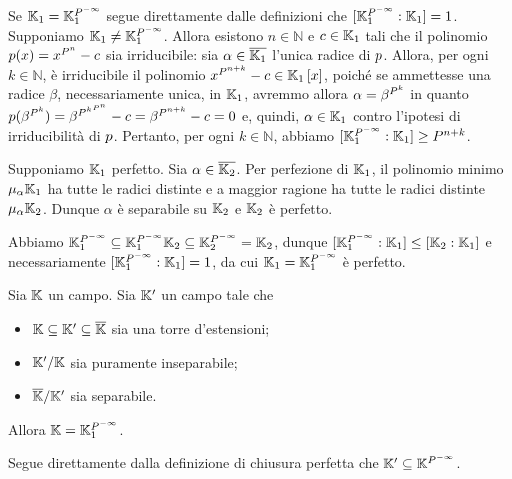 \par Se $\Field_1 = \PerfectClosure{\Field_1}$ segue direttamente dalle definizioni che $\FieldDegree{\PerfectClosure{\Field_1}}{\Field_1} = 1$. Supponiamo $\Field_1 \neq \PerfectClosure{\Field_1}$. Allora esistono $n \in \mathbb{N}$ e $c \in \mathbb{K}_1$ tali che il polinomio $p(x) = x^{P^n} - c$ sia irriducibile: sia $\alpha \in \overline{\mathbb{K}_1}$ l'unica radice di $p$. Allora, per ogni $k \in \mathbb{N}$, \`e irriducibile il polinomio $x^{P^{n + k}} - c \in \mathbb{K}_1 \left [ x \right ]$, poich\'e se ammettesse una radice $\beta$, necessariamente unica, in $\mathbb{K}_1$, avremmo allora $\alpha = \beta^{P^k}$ in quanto $p(\beta^{P^k}) = \beta^{{P^k}^{P^n}} - c = \beta^{P^{n + k}} - c = 0$ e, quindi, $\alpha \in \mathbb{K}_1$ contro l'ipotesi di irriducibilit\`a di $p$. Pertanto, per ogni $k \in \mathbb{N}$, abbiamo $\FieldDegree{\PerfectClosure{\Field_1}}{\Field_1} \geq \Prime^{n + k}$.
\par Supponiamo $\mathbb{K}_1$ perfetto. Sia $\alpha \in \overline{\mathbb{K}_2}$. Per perfezione di $\mathbb{K}_1$, il polinomio minimo $\MinimalPolynomial{\alpha}{\Field_1}$ ha tutte le radici distinte e a maggior ragione ha tutte le radici distinte $\MinimalPolynomial{\alpha}{\Field_2}$. Dunque $\alpha$ \`e separabile su $\mathbb{K}_2$ e $\mathbb{K}_2$ \`e perfetto.
\par Abbiamo $\PerfectClosure{\Field_1} \subseteq \FieldComposition{\PerfectClosure{\Field_1}}{\Field_2} \subseteq \PerfectClosure{\Field_2} = \Field_2$, dunque $\FieldDegree{\PerfectClosure{\Field_1}}{\Field_1} \leq \FieldDegree{\Field_2}{\Field_1}$ e necessariamente $\FieldDegree{\PerfectClosure{\Field_1}}{\Field_1} = 1$, da cui $\Field_1 = \PerfectClosure{\Field_1}$ \`e perfetto. \EndProof
\begin{Theorem}
	Sia $\mathbb{K}$ un campo. Sia $\mathbb{K}'$ un campo tale che
	\begin{itemize}
		\item $\mathbb{K} \subseteq \mathbb{K}' \subseteq \overline{\mathbb{K}}$ sia una torre d'estensioni;
		\item $\mathbb{K}'/\mathbb{K}$ sia puramente inseparabile;
		\item $\overline{\mathbb{K}}/\mathbb{K}'$ sia separabile.
	\end{itemize}
	Allora $\Field = \PerfectClosure{\Field_1}$.
\end{Theorem}
\Proof Segue direttamente dalla definizione di chiusura perfetta che $\Field' \subseteq \PerfectClosure{\Field}$.
